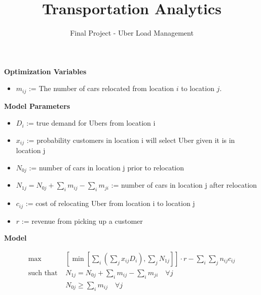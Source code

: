 \documentclass[12pt]{article}
\begin{document}
 
 
\title{Transportation Analytics}
\author{Final Project - Uber Load Management}

\maketitle

\textbf{Optimization Variables}

\begin{itemize}
\item $m_{ij}$ := The number of cars relocated from location $i$ to location $j$.
\end{itemize}

\vspace{.3 in}

\textbf{Model Parameters}
\begin{itemize}
\item $D_i$ := true demand for Ubers from location i
\item $x_{ij}$ := probability customers in location i will select Uber given it is in location j
\item $N_{0j}$ := number of cars in location j prior to relocation
\item $N_{1j} = N_{0j} + \sum_im_{ij} - \sum_im_{ji}$ := number of cars in location j after relocation
\item $c_{ij}$ := cost of relocating Uber from location i to location j
\item $r$ := revenue from picking up a customer
\end{itemize}

\vspace{.3 in}

\textbf{Model}

\begin{align*}
\max & \left[\min\left[\sum_i \left(\sum_j x_{ij}D_i\right),\sum_j N_{1j} \right]\right]\cdot r - \sum_i\sum_jn_{ij}c_{ij} \\
\text{such that      } & N_{1j} = N_{0j} + \sum_i m_{ij} - \sum_i m_{ji} \quad \forall j\\
& N_{0j}\geq \sum_i m_{ij} \quad \forall j
\end{align*}
\end{document}

